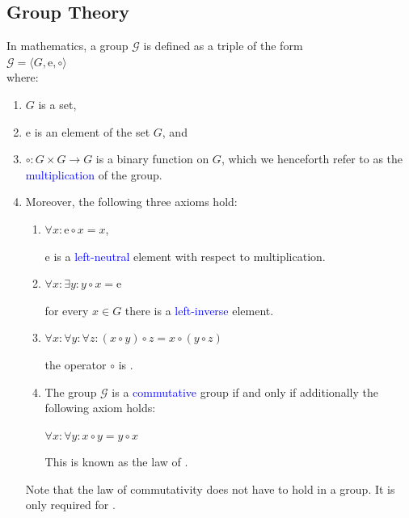 \subsection{Group Theory}
In mathematics, a group $\mathcal{G}$  is defined as a triple of the form
\\[0.2cm]
\hspace*{1.3cm}
$\mathcal{G} = \langle G, \mathrm{e}, \circ \rangle$
\\[0.2cm]
where:
\begin{enumerate}
\item $G$ is a set,
\item $\mathrm{e}$ is an element of the set $G$, and
\item $\circ: G \times G \rightarrow G$ is a binary function on $G$, which we henceforth refer to as the
      \textcolor{blue}{multiplication} of the group.
\item Moreover, the following three axioms hold:
      \begin{enumerate}
      \item $\forall x: \mathrm{e} \circ x = x$,
        
            $\mathrm{e}$ is a \textcolor{blue}{left-neutral} element with respect to multiplication.
      \item $\forall x: \exists{y}: y \circ x = \mathrm{e}$

            for every $x \in G$ there is a \textcolor{blue}{left-inverse} element.
      \item $\forall x: \forall y: \forall z: (x \circ y) \circ z = x \circ (y \circ z)$

            the operator $\circ$ is .

      \item The group $\mathcal{G}$ is a \textcolor{blue}{commutative} group if and only if additionally the
            following axiom holds: 
        
            $\forall x: \forall y: x \circ y = y \circ x$

            This is known as the law of .
            \eox
      \end{enumerate}
      Note that the law of commutativity does not have to hold in a group.  It is only required for
      . 
\end{enumerate}


